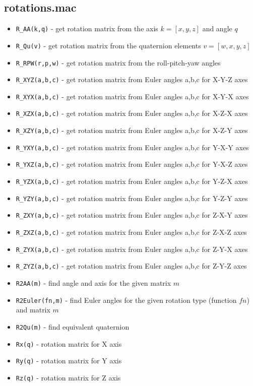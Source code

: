 \documentclass{article}
\begin{document}
\subsection{rotations.mac}

\begin{itemize}
    \item \texttt{R\_AA(k,q)} - get rotation matrix from the axis $k = [x,y,z]$ and angle $q$ 
    \item \texttt{R\_Qu(v)} - get rotation matrix from the quaternion elements $v = [w,x,y,z]$
    \item \texttt{R\_RPW(r,p,w)} - get rotation matrix from the roll-pitch-yaw angles 
    \item \texttt{R\_XYZ(a,b,c)} - get rotation matrix from Euler angles a,b,c for X-Y-Z axes 
    \item \texttt{R\_XYX(a,b,c)} - get rotation matrix from Euler angles a,b,c for X-Y-X axes
    \item \texttt{R\_XZX(a,b,c)} - get rotation matrix from Euler angles a,b,c for X-Z-X axes
    \item \texttt{R\_XZY(a,b,c)} - get rotation matrix from Euler angles a,b,c for X-Z-Y axes
    \item \texttt{R\_YXY(a,b,c)} - get rotation matrix from Euler angles a,b,c for Y-X-Y axes
    \item \texttt{R\_YXZ(a,b,c)} - get rotation matrix from Euler angles a,b,c for Y-X-Z axes
    \item \texttt{R\_YZX(a,b,c)} - get rotation matrix from Euler angles a,b,c for Y-Z-X axes
    \item \texttt{R\_YZY(a,b,c)} - get rotation matrix from Euler angles a,b,c for Y-Z-Y axes
    \item \texttt{R\_ZXY(a,b,c)} - get rotation matrix from Euler angles a,b,c for Z-X-Y axes
    \item \texttt{R\_ZXZ(a,b,c)} - get rotation matrix from Euler angles a,b,c for Z-X-Z axes
    \item \texttt{R\_ZYX(a,b,c)} - get rotation matrix from Euler angles a,b,c for Z-Y-X axes
    \item \texttt{R\_ZYZ(a,b,c)} - get rotation matrix from Euler angles a,b,c for Z-Y-Z axes
    \item \texttt{R2AA(m)} - find angle and axis for the given matrix $m$ 
    \item \texttt{R2Euler(fn,m)} - find Euler angles for the given rotation type (function $fn$) and matrix $m$ 
    \item \texttt{R2Qu(m)} - find equivalent quaternion 
    \item \texttt{Rx(q)} - rotation matrix for X axis
    \item \texttt{Ry(q)} - rotation matrix for Y axis
    \item \texttt{Rz(q)} - rotation matrix for Z axis
\end{itemize}
\end{document}
